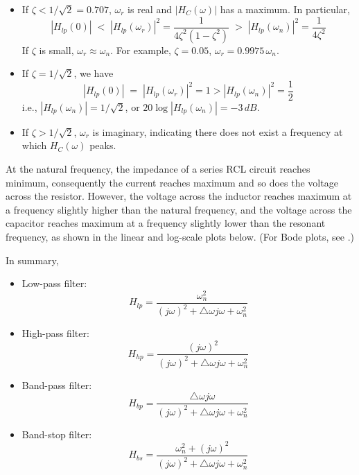 \begin{itemize}
  \begin{itemize}
  \item If $\zeta<1/\sqrt{2}=0.707$, $\omega_r$ is real and $|H_C(\omega)|$
    has a maximum. In particular,
    \[
    |H_{lp}(0)|\;<\;|H_{lp}(\omega_r)|^2=\frac{1}{4\zeta^2(1-\zeta^2)}
    \;>\; |H_{lp}(\omega_n)|^2=\frac{1}{4\zeta^2}
    \]
    If $\zeta$ is small, $\omega_r\approx\omega_n$. For example,
    $\zeta=0.05$, $\omega_r=0.9975\,\omega_n$. 

  \item If $\zeta=1/\sqrt{2}$, we have
    \[
    |H_{lp}(0)|\;=\;|H_{lp}(\omega_r)|^2=1>|H_{lp}(\omega_n)|^2=\frac{1}{2}
    \]
    i.e., $|H_{lp}(\omega_n)|=1/\sqrt{2}$, or $20\log |H_{lp}(\omega_n)|=-3\,dB$.
  \item If $\zeta>1/\sqrt{2}$, $\omega_r$ is imaginary, indicating
    there does not exist a frequency at which $H_C(\omega)$ peaks. 
  \end{itemize}


\end{itemize}


At the natural frequency, the impedance of a series RCL circuit reaches
minimum, consequently the current reaches maximum and so does the voltage 
across the resistor. However, the voltage across the inductor reaches 
maximum at a frequency slightly higher than the natural frequency, and 
the voltage across the capacitor reaches maximum at a frequency slightly 
lower than the resonant frequency, as shown in the linear and log-scale 
plots below. (For Bode plots, see
.)


In summary,

\begin{itemize}
\item Low-pass filter:
  \[
  H_{lp}=\frac{\omega_n^2}{(j\omega)^2+\triangle \omega j\omega+\omega_n^2}
  \]
\item High-pass filter:
  \[
  H_{hp}=\frac{(j\omega)^2}{(j\omega)^2+\triangle \omega j\omega+\omega_n^2}
  \]
\item Band-pass filter:
  \[
  H_{bp}=\frac{\triangle\omega j\omega}{(j\omega)^2+\triangle \omega j\omega+\omega_n^2}
  \]
\item Band-stop filter:
  \[
  H_{bs}=\frac{\omega_n^2+(j\omega)^2}{(j\omega)^2+\triangle \omega j\omega+\omega_n^2}
  \]
\end{itemize}

